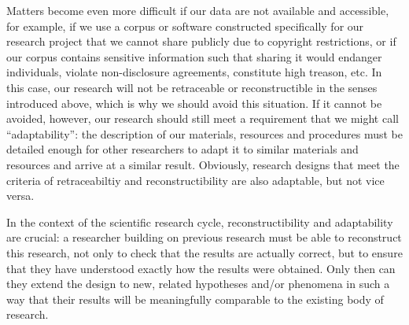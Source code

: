 Matters become even more difficult if our data are not available and accessible, for example, if we use a corpus or software constructed specifically for our research project that we cannot share publicly due to copyright restrictions, or if our corpus contains sensitive information such that sharing it would endanger individuals, violate non-disclosure agreements, constitute high treason, etc. In this case, our research will not be retraceable or reconstructible in the senses introduced above, which is why we should avoid this situation. If it cannot be avoided, however, our research should still meet a requirement that we might call ``adaptability'': the description of our materials, resources and procedures must be detailed enough for other researchers to adapt it to similar materials and resources and arrive at a similar result. Obviously, research designs that meet the criteria of retraceabiltiy and reconstructibility are also adaptable, but not vice versa.

In the context of the scientific research cycle, reconstructibility and adaptability are crucial: a researcher building on previous research must be able to reconstruct this research, not only to check that the results are actually correct, but to ensure that they have understood exactly how the results were obtained. Only then can they extend the design to new, related hypotheses and/or phenomena in such a way that their results will be meaningfully comparable to the existing body of research.

